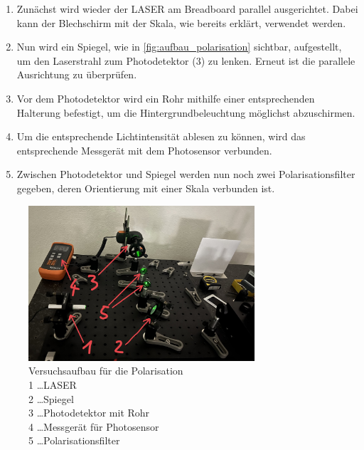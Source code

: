 \documentclass[12pt,english,ngerman]{scrartcl}
\begin{document}
\begin{enumerate}
	\item Zunächst wird wieder der LASER am Breadboard parallel ausgerichtet. Dabei kann
	      der Blechschirm mit der Skala, wie bereits erklärt, verwendet werden.
	\item Nun wird ein Spiegel, wie in \autoref{fig:aufbau_polarisation} sichtbar,
	      aufgestellt, um den Laserstrahl zum Photodetektor (3) zu lenken. Erneut ist die
	      parallele Ausrichtung zu überprüfen.
	\item Vor dem Photodetektor wird ein Rohr mithilfe einer entsprechenden Halterung
	      befestigt, um die Hintergrundbeleuchtung möglichst abzuschirmen.
	\item Um die entsprechende Lichtintensität ablesen zu können, wird das entsprechende
	      Messgerät mit dem Photosensor verbunden.
	\item Zwischen Photodetektor und Spiegel werden nun noch zwei Polarisationsfilter
	      gegeben, deren Orientierung mit einer Skala verbunden ist.
\end{enumerate}

\begin{figure}[H]
	\begin{center}
		\includegraphics[width =0.75\textwidth]{./figures/aufbau_polarisation.jpg}
	\end{center}
	\caption[Versuchsaufbau für die Polarisation] { Versuchsaufbau für die Polarisation \\
		1 \dots LASER                       \\
		2 \dots Spiegel                     \\
		3 \dots Photodetektor mit Rohr      \\
		4 \dots Messgerät für Photosensor   \\
		5 \dots Polarisationsfilter
	}\label{fig:aufbau_polarisation}
\end{figure}
\end{document}
